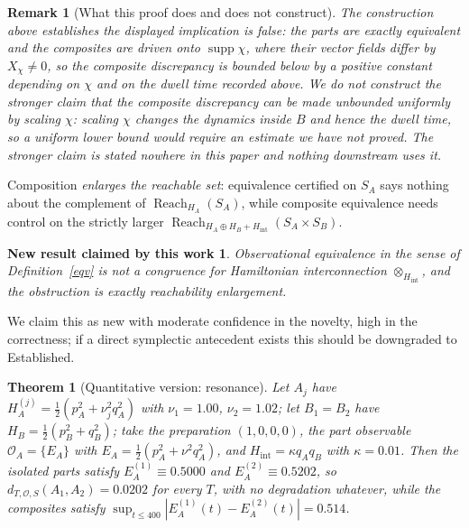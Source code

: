 \documentclass[12pt,a4paper]{article}
\theoremstyle{definition}
\theoremstyle{plain}
\newtheorem{theorem}[definition]{Theorem}
\theoremstyle{commentary}
\newtheorem{newresult}[definition]{New result claimed by this work}
\newtheorem{remark}[definition]{Remark}
\newcommand{\Oc}{\mathcal{O}}
\newcommand{\Reach}{\operatorname{Reach}}
\begin{document}
\begin{remark}[What this proof does and does not construct]
\label{congres}
The construction above establishes the displayed implication is false: the parts are exactly equivalent and the composites are driven onto $\operatorname{supp}\chi$, where their vector fields differ by $X_\chi\neq0$, so the composite discrepancy is bounded below by a positive constant depending on $\chi$ and on the dwell time recorded above. We do \emph{not} construct the stronger claim that the composite discrepancy can be made \emph{unbounded} uniformly by scaling $\chi$: scaling $\chi$ changes the dynamics inside $B$ and hence the dwell time, so a uniform lower bound would require an estimate we have not proved. The stronger claim is stated nowhere in this paper and nothing downstream uses it.
\end{remark}

Composition \emph{enlarges the reachable set}: equivalence certified on $S_A$ says nothing about the complement of $\Reach_{H_A}(S_A)$, while composite equivalence needs control on the strictly larger $\Reach_{H_A\oplus H_B+H_{\mathrm{int}}}(S_A\times S_B)$.

\begin{newresult}
\label{ncg}
Observational equivalence in the sense of Definition~\ref{eqv} is not a congruence for Hamiltonian interconnection $\otimes_{H_{\mathrm{int}}}$, and the obstruction is exactly reachability enlargement.
\end{newresult}

We claim this as new with moderate confidence in the novelty, high in the correctness; if a direct symplectic antecedent exists this should be downgraded to Established.

\begin{theorem}[Quantitative version: resonance]
\label{res}
Let $A_j$ have $H_A^{(j)}=\tfrac12(p_A^2+\nu_j^2q_A^2)$ with $\nu_1=1.00$, $\nu_2=1.02$; let $B_1=B_2$ have $H_B=\tfrac12(p_B^2+q_B^2)$; take the preparation $(1,0,0,0)$, the part observable $\Oc_A=\{E_A\}$ with $E_A=\tfrac12(p_A^2+\nu^2q_A^2)$, and $H_{\mathrm{int}}=\kappa q_Aq_B$ with $\kappa=0.01$. Then the isolated parts satisfy $E_A^{(1)}\equiv0.5000$ and $E_A^{(2)}\equiv0.5202$, so $d_{T,\Oc,S}(A_1,A_2)=0.0202$ for \emph{every} $T$, with no degradation whatever, while the composites satisfy $\sup_{t\le400}|E_A^{(1)}(t)-E_A^{(2)}(t)|=0.514$.
\end{theorem}
\end{document}
